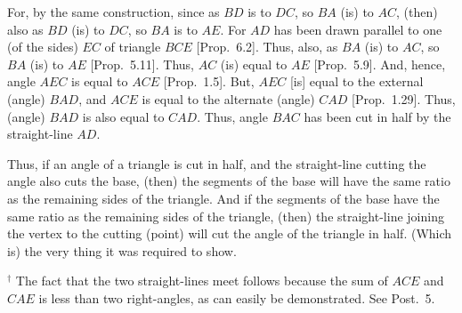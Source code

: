\begin{Parallel}{}{}
{For, by the same construction, since as $BD$ is to $DC$, so $BA$ (is) to
$AC$, (then) also as $BD$ (is) to $DC$, so $BA$ is to $AE$. For $AD$ has been drawn
parallel to one (of the sides) $EC$ of triangle $BCE$ [Prop.~6.2]. Thus, also, as $BA$ (is) to $AC$,
so $BA$ (is) to $AE$  [Prop.~5.11]. Thus,
$AC$ (is) equal to $AE$ [Prop.~5.9].
And, hence, angle $AEC$ is equal to $ACE$  [Prop.~1.5]. But, 
$AEC$ [is] equal to the external (angle) $BAD$, and $ACE$ is equal to the alternate
(angle) $CAD$  [Prop.~1.29]. Thus, (angle) $BAD$ is
also equal to $CAD$. Thus, angle $BAC$ has been cut in half by the
straight-line $AD$.

Thus, if an angle of a triangle is cut in half, and the
straight-line cutting the angle also cuts the base, (then) the segments of the base
will have the same ratio as the remaining sides of the triangle. And if
the segments of the base have the same ratio as the remaining sides of the
triangle, (then) the straight-line joining the vertex to the cutting (point) will
cut the angle of the triangle in half. (Which is) the very thing it was required
to show.}
\end{Parallel}
{\footnotesize \noindent$^\dag$ The fact that the
two straight-lines meet follows because the sum of $ACE$ and $CAE$
is less than two right-angles, as can easily be demonstrated. See Post.~5.}


